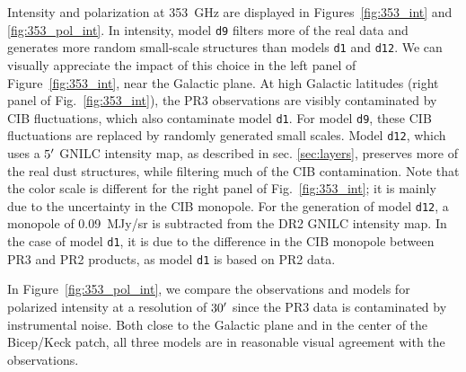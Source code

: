\documentclass[twocolumn]{aastex631}
\begin{document}
Intensity and polarization at 353~GHz are displayed in Figures~\ref{fig:353_int} and \ref{fig:353_pol_int}. 
In intensity, model {\tt d9} filters more of the real data and generates more random small-scale structures than models {\tt d1} and {\tt d12}. We can visually appreciate the impact of this choice in the left panel of Figure~\ref{fig:353_int}, near the Galactic plane. At high Galactic latitudes (right panel of Fig.~\ref{fig:353_int}), the PR3 observations are visibly contaminated by CIB fluctuations, which also contaminate model {\tt d1}. For model {\tt d9}, these CIB fluctuations are replaced by randomly generated small scales. Model {\tt d12}, which uses a $5\mbox{$^\prime$}$ GNILC intensity map, as described in sec. \ref{sec:layers}, preserves more of the real dust structures, while filtering much of the CIB contamination.
Note that the color scale is different for the right panel of Fig.~\ref{fig:353_int}; it is mainly due to the uncertainty in the CIB monopole. For the generation of model {\tt d12}, a monopole of 0.09~MJy/sr is subtracted from the DR2 GNILC intensity map. 
In the case of model {\tt d1}, it is due to the difference in the CIB monopole between PR3 and PR2 products, as model {\tt d1} is based on PR2 data. 

In Figure~\ref{fig:353_pol_int}, we compare the observations and models for polarized intensity at a resolution of $30\mbox{$^\prime$}$ since the PR3 data is contaminated by instrumental noise. 
Both close to the Galactic plane and in the center of the Bicep/Keck patch, all three models are in reasonable visual agreement with the observations. 
\end{document}
